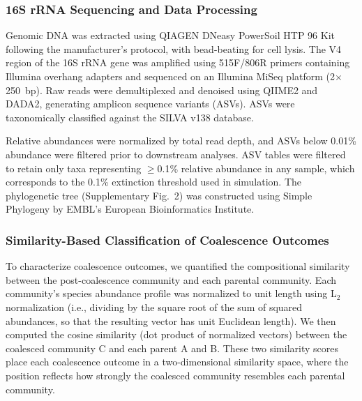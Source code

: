 \subsubsection*{16S rRNA Sequencing and Data Processing}
\label{sec:suppl:methods:sequencing}

Genomic DNA was extracted using QIAGEN DNeasy PowerSoil HTP 96 Kit following the manufacturer's protocol, with bead-beating for cell lysis. The V4 region of the 16S rRNA gene was amplified using 515F/806R primers containing Illumina overhang adapters and sequenced on an Illumina MiSeq platform (2$\times$250~bp). Raw reads were demultiplexed and denoised using QIIME2 and DADA2, generating amplicon sequence variants (ASVs). ASVs were taxonomically classified against the SILVA v138 database.

Relative abundances were normalized by total read depth, and ASVs below 0.01\% abundance were filtered prior to downstream analyses. ASV tables were filtered to retain only taxa representing $\geq$0.1\% relative abundance in any sample, which corresponds to the 0.1\% extinction threshold used in simulation. The phylogenetic tree (Supplementary Fig.~2) was constructed using Simple Phylogeny by EMBL's European Bioinformatics Institute\citep{Madeira2022}.


\subsubsection*{Similarity-Based Classification of Coalescence Outcomes}
\label{sec:suppl:classification}

To characterize coalescence outcomes, we quantified the compositional similarity between the post-coalescence community and each parental community. Each community's species abundance profile was normalized to unit length using L$_2$ normalization (i.e., dividing by the square root of the sum of squared abundances, so that the resulting vector has unit Euclidean length). We then computed the cosine similarity (dot product of normalized vectors) between the coalesced community C and each parent A and B. These two similarity scores place each coalescence outcome in a two-dimensional similarity space, where the position reflects how strongly the coalesced community resembles each parental community.

